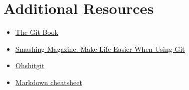\section{Additional Resources}

\begin{itemize}[leftmargin=*]
    \item \href{https://git-scm.com/book/en/v2}{The Git Book}
    \item \href{https://www.smashingmagazine.com/make-life-easier-when-using-git/}{Smashing Magazine: Make Life Easier When Using Git}
	\item \href{https://ohshitgit.com}{Ohshitgit}
	\item \href{https://github.com/adam-p/markdown-here/wiki/Markdown-Cheatsheet}{Markdown cheatsheet}
\end{itemize}
